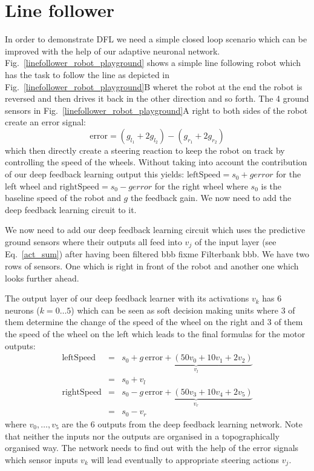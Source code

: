 \documentclass{llncs}
\begin{document}
\section{Line follower}
In order to demonstrate DFL we need a simple closed loop scenario which can be
improved with the help of our adaptive neuronal network. 
Fig.~\ref{linefollower_robot_playground} shows a simple line following robot which has the task to
follow the line as depicted in
Fig.~\ref{linefollower_robot_playground}B wheret the robot at the end the robot is reversed
and then drives it back in the other direction and so forth. The 4 ground sensors
in Fig.~\ref{linefollower_robot_playground}A right to both sides of the robot create
an error signal:
\begin{equation}
\mathrm{error} = (g_{l_1}+2 g_{l_2})-(g_{r_1}+2 g_{r_2}) \label{line_error}
\end{equation}
which then directly create a steering reaction to keep the robot on track by
controlling the speed of the wheels. Without taking into account the contribution
of our deep feedback learning output this yields: $\mathrm{leftSpeed} = s_0 + g error$ for the
left wheel and $\mathrm{rightSpeed} = s_0 - g error$ for the right wheel
where $s_0$ is the baseline speed of the robot and $g$ the feedback gain. We now
need to add the deep feedback learning circuit to it.

We now need to add our deep feedback learning circuit which uses the
predictive ground sensors where their outputs all feed into $v_j$ of
the input layer (see Eq.~\ref{act_sum}) after having been filtered bbb
fixme Filterbank bbb. We have two rows of sensors. One which is right
in front of the robot and another one which looks further ahead.

The output layer of our deep feedback learner with its activations
$v_k$ has 6 neurons ($k=0 \ldots 5$) which can be seen as soft
decision making units where 3 of them determine the change of the speed of
the wheel on the right and 3 of them the speed of the wheel on the
left which leads to the final formulas for the motor outputs:
\begin{eqnarray}
  \mathrm{leftSpeed} &=& s_0 + \underbrace{g\, \mathrm{error} + \left( 50 v_0 + 10 v_1 + 2 v_2 \right)}_{v_l} \\
                     &=& s_0 + v_l \\
  \mathrm{rightSpeed} &=& s_0 - \underbrace{g\, \mathrm{error} + \left( 50 v_3 + 10 v_4 + 2 v_5 \right)}_{v_r} \\
                     &=& s_0 - v_r
\end{eqnarray}
where $v_0, \ldots, v_5$ are the 6 outputs from the deep feedback learning network.
Note that neither the inputs nor the outputs are organised in a topographically
organised way. The network needs to find out with the help of the error signals
which sensor inputs $v_k$ will lead eventually to appropriate steering actions $v_j$.
\end{document}
